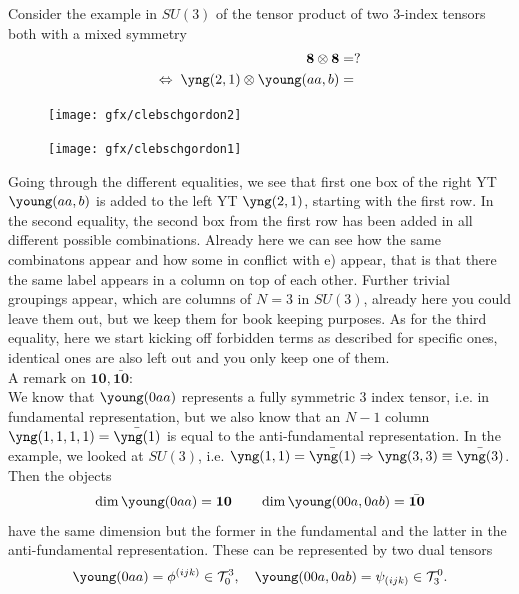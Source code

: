 Consider the example in $SU(3)$ of the tensor product of two $3$-index tensors both with a mixed symmetry
\begin{align*}
	\mathbf{8}\otimes \mathbf{8} &= ?\\
\Leftrightarrow \; \yng(2,1) \otimes \young(aa,b) &=
\end{align*}

\begin{figure}[h!]
	\centering
	\texttt{[image: gfx/clebschgordon2]}
\end{figure}

\begin{figure}[h!]
	\centering
	\texttt{[image: gfx/clebschgordon1]}
	\caption{}
	\label{fig:clebschgordon1}
\end{figure}
Going through the different equalities, we see that first one box of the right YT $\young(aa,b)$ is added to the left YT $\yng(2,1)$, starting with the first row. In the second equality, the second box from the first row has been added in all different possible combinations. Already here we can see how the same combinatons appear and how some in conflict with e) appear, that is that there the same label appears in a column on top of each other. Further trivial groupings appear, which are columns of $N=3$ in $SU(3)$, already here you could leave them out, but we keep them for book keeping purposes. As for the third equality, here we start kicking off forbidden terms as described for specific ones, identical ones are also left out and you only keep one of them.\\
A remark on $\mathbf{10},\bar{\mathbf{10}}$:\\
We know that 
$\young(0aa)$ 
 represents a fully symmetric $3$ index tensor, i.e. in fundamental representation, but we also know that an $N-1$ column $\yng(1,1,1,1)=\bar{\yng(1)}$ is equal to the anti-fundamental representation. In the example, we looked at $SU(3)$, i.e. $\yng(1,1)=\bar{\yng(1)} \Rightarrow \yng(3,3) \equiv \bar{\yng(3)}$. Then the objects
\begin{equation}
\dim
\young(0aa)=\mathbf{10}
\qquad \dim \young(00a,0ab)=\bar{\mathbf{10}}
	\end{equation}
have the same dimension but the former in the fundamental and the latter in the anti-fundamental representation. These can be represented by two dual tensors
\begin{equation}
\young(0aa)=\phi^{(ijk)} \in \mathcal{T}^3_0,\quad \young(00a,0ab)= \psi_{(ijk)} \in \mathcal{T}^0_3.
\end{equation}

